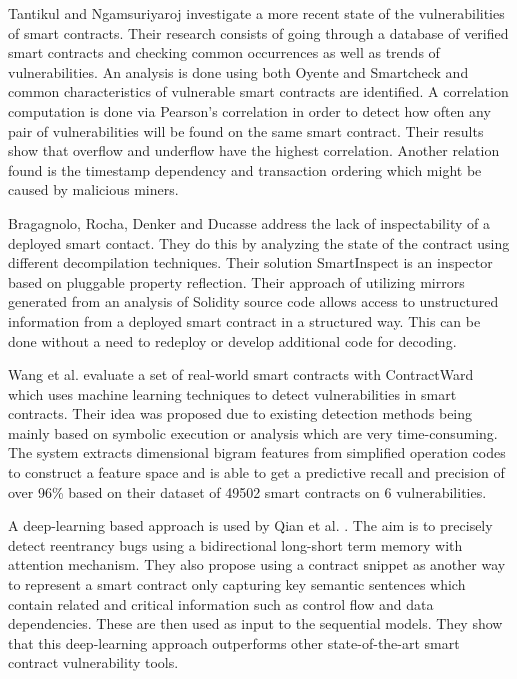 \documentclass[sigconf]{acmart}
\begin{document}
Tantikul and Ngamsuriyaroj \cite{icissp20} investigate a more recent state of the vulnerabilities of smart contracts. Their research consists of going through a database of verified smart contracts and checking common occurrences as well as trends of vulnerabilities. An analysis is done using both Oyente and Smartcheck and common characteristics of vulnerable smart contracts are identified. A correlation computation is done via Pearson's correlation in order to detect how often any pair of vulnerabilities will be found on the same smart contract. Their results show that overflow and underflow have the highest correlation. Another relation found is the timestamp dependency and transaction ordering which might be caused by malicious miners.  

Bragagnolo, Rocha, Denker and Ducasse \cite{rocha} address the lack of inspectability of a deployed smart contact. They do this by analyzing the state of the contract using different decompilation techniques. Their solution SmartInspect is an inspector based on pluggable property reflection. Their approach of utilizing mirrors generated from an analysis of Solidity source code allows access to unstructured information from a deployed smart contract in a structured way. This can be done without a need to redeploy or develop additional code for decoding. 

Wang et al. \cite{contractward} evaluate a set of real-world smart contracts with ContractWard which uses machine learning techniques to detect vulnerabilities in smart contracts. Their idea was proposed due to existing detection methods being mainly based on symbolic execution or analysis which are very time-consuming. The system extracts dimensional bigram features from simplified operation codes to construct a feature space and is able to get a predictive recall and precision of over 96\% based on their dataset of 49502 smart contracts on 6 vulnerabilities.

A deep-learning based approach is used by Qian et al. \cite{automated}. The aim is to precisely detect reentrancy bugs using a bidirectional long-short term memory with attention mechanism. They also propose using a contract snippet as another way to represent a smart contract only capturing key semantic sentences which contain related and critical information such as control flow and data dependencies. These are then used as input to the sequential models. They show that this deep-learning approach outperforms other state-of-the-art smart contract vulnerability tools.
\end{document}
